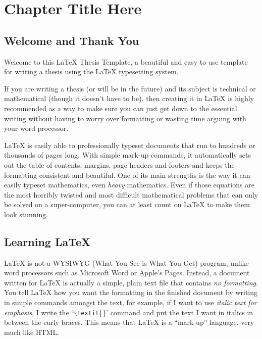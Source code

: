 
\chapter{Chapter Title Here} %

\label{Chapter1} %



\section{Welcome and Thank You}
Welcome to this \LaTeX{} Thesis Template, a beautiful and easy to use template for writing a thesis using the \LaTeX{} typesetting system.

If you are writing a thesis (or will be in the future) and its subject is technical or mathematical (though it doesn't have to be), then creating it in \LaTeX{} is highly recommended as a way to make sure you can just get down to the essential writing without having to worry over formatting or wasting time arguing with your word processor.

\LaTeX{} is easily able to professionally typeset documents that run to hundreds or thousands of pages long. With simple mark-up commands, it automatically sets out the table of contents, margins, page headers and footers and keeps the formatting consistent and beautiful. One of its main strengths is the way it can easily typeset mathematics, even \emph{heavy} mathematics. Even if those equations are the most horribly twisted and most difficult mathematical problems that can only be solved on a super-computer, you can at least count on \LaTeX{} to make them look stunning.


\section{Learning \LaTeX{}}

\LaTeX{} is not a WYSIWYG (What You See is What You Get) program, unlike word processors such as Microsoft Word or Apple's Pages. Instead, a document written for \LaTeX{} is actually a simple, plain text file that contains \emph{no formatting}. You tell \LaTeX{} how you want the formatting in the finished document by writing in simple commands amongst the text, for example, if I want to use \textit{italic text for emphasis}, I write the `$\backslash$\texttt{textit}\{\}' command and put the text I want in italics in between the curly braces. This means that \LaTeX{} is a ``mark-up'' language, very much like HTML.

